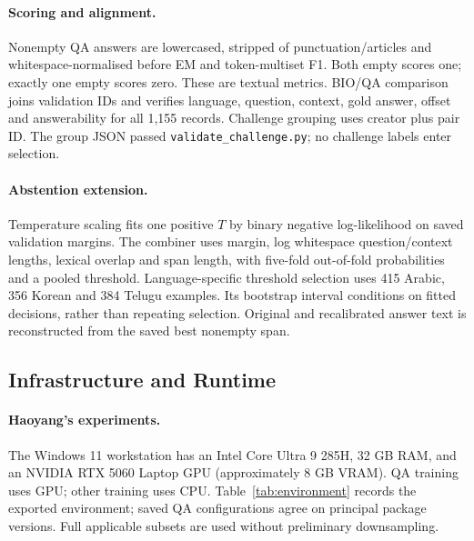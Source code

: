 \documentclass[11pt]{article}
\begin{document}
\paragraph{Scoring and alignment.}
Nonempty QA answers are lowercased, stripped of punctuation/articles and whitespace-normalised before EM and token-multiset F1. Both empty scores one; exactly one empty scores zero. These are textual metrics. BIO/QA comparison joins validation IDs and verifies language, question, context, gold answer, offset and answerability for all 1,155 records. Challenge grouping uses creator plus pair ID. The group JSON passed \texttt{validate\_challenge.py}; no challenge labels enter selection.

\paragraph{Abstention extension.}
Temperature scaling fits one positive $T$ by binary negative log-likelihood on saved validation margins. The combiner uses margin, log whitespace question/context lengths, lexical overlap and span length, with five-fold out-of-fold probabilities and a pooled threshold. Language-specific threshold selection uses 415 Arabic, 356 Korean and 384 Telugu examples. Its bootstrap interval conditions on fitted decisions, rather than repeating selection. Original and recalibrated answer text is reconstructed from the saved best nonempty span.

\subsection{Infrastructure and Runtime}
\paragraph{Haoyang's experiments.}
The Windows 11 workstation has an Intel Core Ultra 9 285H, 32 GB RAM, and an NVIDIA RTX 5060 Laptop GPU (approximately 8 GB VRAM). QA training uses GPU; other training uses CPU. Table~\ref{tab:environment} records the exported environment; saved QA configurations agree on principal package versions. Full applicable subsets are used without preliminary downsampling.
\end{document}
